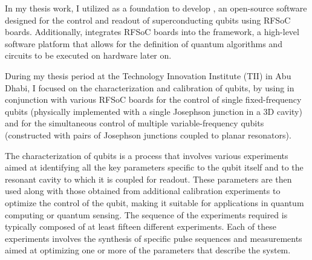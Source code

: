 In my thesis work, I utilized \Qick as a foundation to develop \Qibosoq, an open-source software designed for the control and readout of superconducting qubits using RFSoC boards.
Additionally, \Qibosoq integrates RFSoC boards into the \Qibo framework, a high-level software platform that allows for the definition of quantum algorithms and circuits to be executed on hardware later on.

During my thesis period at the Technology Innovation Institute (TII) in Abu Dhabi, I focused on the characterization and calibration of qubits, by using \Qibosoq in conjunction with various RFSoC boards for the control of single fixed-frequency qubits (physically implemented with a single Josephson junction in a 3D cavity) and for the simultaneous control of multiple variable-frequency qubits (constructed with pairs of Josephson junctions coupled to planar resonators).

%
The characterization of qubits is a process that involves various experiments aimed at identifying all the key parameters specific to the qubit itself and to the resonant cavity to which it is coupled for readout.
These parameters are then used along with those obtained from additional calibration experiments to optimize the control of the qubit, making it suitable for applications in quantum computing or quantum sensing.
The sequence of the experiments required is typically composed of at least fifteen different experiments.
Each of these experiments involves the synthesis of specific pulse sequences and measurements aimed at optimizing one or more of the parameters that describe the system.\\
%
%

